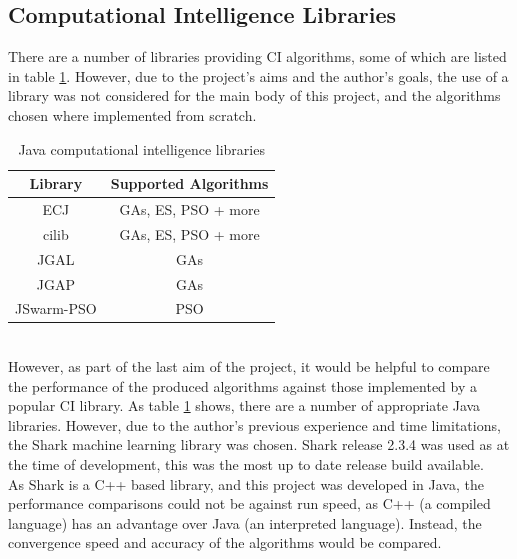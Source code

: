 \subsection{Computational Intelligence Libraries}
There are a number of libraries providing CI algorithms, some of which are listed in table \ref{tab:lib}. However, due to the project's aims and the author's goals, the use of a library was not considered for the main body of this project, and the algorithms chosen where implemented from scratch.
\begin{table}[tp]
   \begin{minipage}{\textwidth}
      \begin{center}
         \begin{tabular}{c|c}
           Library & Supported Algorithms \\
           \hline
           ECJ \cite{ecj}                      & GAs, ES, PSO + more \\
           cilib \cite{cilib}                     & GAs, ES, PSO + more \\
           JGAL \cite{jgal}                   & GAs \\
           JGAP \cite{jgap}                 & GAs \\
  	JSwarm-PSO \cite{jswarm} & PSO
         \end{tabular}
      \end{center}
   \end{minipage}
   \caption{Java computational intelligence libraries}
   \label{tab:lib}
\end{table}
\\However, as part of the last aim of the project, it would be helpful to compare the performance of the produced algorithms against those implemented by a popular CI library. As table \ref{tab:lib} shows, there are a number of appropriate Java libraries. However, due to the author's previous experience and time limitations, the Shark machine learning library\cite{shark} was chosen. Shark release 2.3.4\cite{sharksf} was used as at the time of development, this was the most up to date release build available.
\\As Shark is a C++ based library, and this project was developed in Java, the performance comparisons could not be against run speed, as C++ (a compiled language) has an advantage over Java (an interpreted language). Instead, the convergence speed and accuracy of the algorithms would be compared.